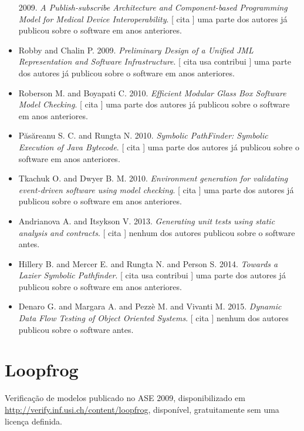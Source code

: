 \begin{itemize}
      2009.
        \textit{ A Publish-subscribe Architecture and Component-based Programming Model for Medical Device Interoperability}.
      [
          cita
      ]
uma parte dos autores já publicou sobre o software em anos anteriores.
\item Robby and Chalin P.
      2009.
        \textit{ Preliminary Design of a Unified JML Representation and Software Infrastructure}.
      [
          cita
          usa
          contribui
      ]
uma parte dos autores já publicou sobre o software em anos anteriores.
\item Roberson M. and Boyapati C.
      2010.
        \textit{ Efficient Modular Glass Box Software Model Checking}.
      [
          cita
      ]
uma parte dos autores já publicou sobre o software em anos anteriores.
\item P\u{a}s\u{a}reanu S. C. and Rungta N.
      2010.
        \textit{ Symbolic PathFinder: Symbolic Execution of Java Bytecode}.
      [
          cita
      ]
uma parte dos autores já publicou sobre o software em anos anteriores.
\item Tkachuk O. and Dwyer B. M.
      2010.
        \textit{ Environment generation for validating event-driven software using model checking}.
      [
          cita
      ]
uma parte dos autores já publicou sobre o software em anos anteriores.
\item Andrianova A. and Itsykson V.
      2013.
        \textit{ Generating unit tests using static analysis and contracts}.
      [
          cita
      ]
nenhum dos autores publicou sobre o software antes.
\item Hillery B. and Mercer E. and Rungta N. and Person S.
      2014.
        \textit{ Towards a Lazier Symbolic Pathfinder}.
      [
          cita
          usa
          contribui
      ]
uma parte dos autores já publicou sobre o software em anos anteriores.
\item Denaro G. and Margara A. and Pezzè M. and Vivanti M.
      2015.
        \textit{ Dynamic Data Flow Testing of Object Oriented Systems}.
      [
          cita
      ]
nenhum dos autores publicou sobre o software antes.
\end{itemize}
\section{Loopfrog}

Verificação de modelos
publicado no ASE 2009,
disponibilizado em \url{http://verify.inf.usi.ch/content/loopfrog},
disponível,
gratuitamente
sem uma licença definida.

